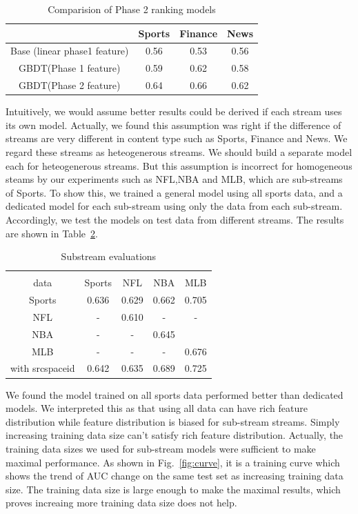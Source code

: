 \begin{table}
\caption{Comparision of Phase 2 ranking models}
\begin{tabular}{|c|c|c|c|}\hline
             & Sports & Finance & News \\ \hline
Base (linear phase1 feature) & 0.56 & 0.53 & 0.56 \\ \hline 
GBDT(Phase 1 feature)  & 0.59& 0.62& 0.58 \\ \hline
GBDT(Phase 2 feature) & 0.64 & 0.66 & 0.62 \\ \hline
\end{tabular}

\label{phase2sum}
\end{table}


Intuitively, we would assume better results could be derived if each stream uses its own model. Actually, we found this assumption was right if the difference of streams are very different in content type such as Sports, Finance and News. We regard these streams as heteogenerous streams. We should build a separate model each for heteogenerous streams. But this assumption is incorrect for homogeneous steams by our experiments such as NFL,NBA and MLB, which are sub-streams of Sports.  To show this, we trained a general model using all sports data, and a dedicated model for each sub-stream using only the data from each sub-stream. Accordingly, we test the models on test data from different streams. The results are shown in Table~\ref{tab:substream}. 

\begin{table}
\caption{Substream evaluations}
\begin{tabular}{|c|c|c|c|c|} \hline
    \diaghead{\theadfont training  test data}{training \\ data}{test  data}   & Sports & NFL & NBA & MLB \\ \hline
    Sports & 0.636 &0.629 &0.662 &0.705 \\ \hline
    NFL & - & 0.610 & - & - \\ \hline
    NBA & - & - & 0.645 & \\ \hline
   MLB & - & - & - & 0.676 \\ \hline
   with srcspaceid  & 0.642  & 0.635 &0.689 & 0.725 \\ \hline
\end{tabular}

\label{tab:substream}
\end{table}

We found the model trained on all sports data performed better than dedicated models. 
We interpreted this as that using all data can have rich feature distribution while  feature distribution is biased for sub-stream streams. Simply increasing training data size can't satisfy rich feature distribution.  Actually, the training data sizes we used for sub-stream models  were sufficient to make maximal performance. As shown in Fig.~\ref{fig:curve}, it is a training curve which shows the trend of  AUC change on the same test set as increasing training data size. The training data size is large enough to make the maximal results, which proves increaing more training data size does not help.  

